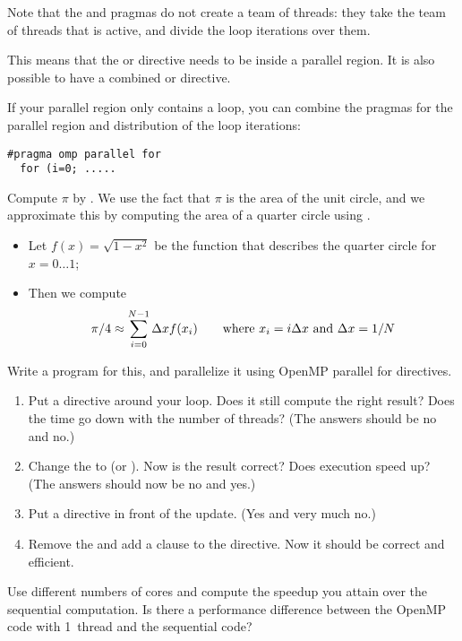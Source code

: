 Note that the  and 
pragmas do not create a team of threads: they
take the team of threads that is active,
and divide the loop iterations over them.

This means that the  or  directive needs to be
inside a parallel region. It is also possible to have a combined
 or  directive.

If your parallel region only contains a loop, you can combine the
pragmas for the parallel region and distribution of the loop iterations:
\begin{verbatim}
#pragma omp parallel for
  for (i=0; .....
\end{verbatim}

\begin{exercise}
  \label{ex:omp-pi}
  Compute $\pi$ by . We use the fact that $\pi$
  is the area of the unit circle, and we approximate this by computing
  the area of a quarter circle using .
  \begin{itemize}
  \item Let $f(x)=\sqrt{1-x^2}$ be the function that describes the
    quarter circle for $x=0\ldots 1$;
  \item Then we compute \[ \pi/4\approx\sum_{i=0}^{N-1} \Delta x
    f(x_i) \qquad \hbox{where $x_i=i\Delta x$ and $\Delta x=1/N$} \]
  \end{itemize}
  Write a program for this, and parallelize it using OpenMP parallel
  for directives.
  \begin{enumerate}
  \item Put a  directive around your loop. Does it still
    compute the right result? Does the time go down with the number of
    threads? (The answers should be no and no.)
  \item Change the  to  (or ). Now is the result correct? Does execution speed up? (The
    answers should now be no and yes.)
  \item Put a  directive in front of the update. (Yes and
    very much no.)
  \item Remove the  and add a clause
     to the  directive.
    Now it should be correct and efficient.
  \end{enumerate}
  Use different numbers of cores and compute the
  speedup you attain over the sequential computation. Is there a
  performance difference between the OpenMP code with 1~thread and the
  sequential code?
\end{exercise}

